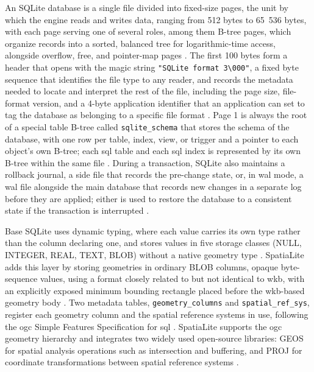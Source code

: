 An SQLite database is a single file divided into fixed-size pages, the unit by which the engine reads and writes data, ranging from 512 bytes to 65~536 bytes, with each page serving one of several roles, among them B-tree pages, which organize records into a sorted, balanced tree for logarithmic-time access, alongside overflow, free, and pointer-map pages \parencite{sqlite2024_fileformat}. The first 100 bytes form a header that opens with the magic string \texttt{"SQLite format 3\textbackslash 000"}, a fixed byte sequence that identifies the file type to any reader, and records the metadata needed to locate and interpret the rest of the file, including the page size, file-format version, and a 4-byte application identifier that an application can set to tag the database as belonging to a specific file format \parencite{sqlite2024_fileformat}. Page 1 is always the root of a special table B-tree called \texttt{sqlite\_schema} that stores the schema of the database, with one row per table, index, view, or trigger and a pointer to each object's own B-tree; each \acrshort{sql} table and each \acrshort{sql} index is represented by its own B-tree within the same file \parencite{sqlite2024_fileformat}. During a transaction, SQLite also maintains a rollback journal, a side file that records the pre-change state, or, in \acrfull{wal} mode, a \acrshort{wal} file alongside the main database that records new changes in a separate log before they are applied; either is used to restore the database to a consistent state if the transaction is interrupted \parencite{sqlite2024_fileformat}.

Base SQLite uses dynamic typing, where each value carries its own type rather than the column declaring one, and stores values in five storage classes (NULL, INTEGER, REAL, TEXT, BLOB) without a native geometry type \parencite{sqlite2024_datatype}. SpatiaLite adds this layer by storing geometries in ordinary BLOB columns, opaque byte-sequence values, using a format closely related to but not identical to \acrshort{wkb}, with an explicitly exposed minimum bounding rectangle placed before the \acrshort{wkb}-based geometry body \parencite{gaia2011_blob_geometry}. Two metadata tables, \texttt{geometry\_columns} and \texttt{spatial\_ref\_sys}, register each geometry column and the spatial reference systems in use, following the \acrshort{ogc} Simple Features Specification for \acrshort{sql} \parencite{gaia2011_spatialite_manual}. SpatiaLite supports the \acrshort{ogc} geometry hierarchy and integrates two widely used open-source libraries: GEOS for spatial analysis operations such as intersection and buffering, and PROJ for coordinate transformations between spatial reference systems \parencite{gaia2011_spatialite_manual}.

